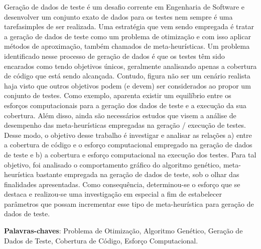 \begin{resumo}
 
Geração de dados de teste é um desafio corrente em Engenharia de Software e desenvolver um conjunto exato de dados para os testes nem sempre é uma tarefasimples de ser realizada.  Uma estratégia que vem sendo empregada é tratar a geração de dados de teste como um problema de otimização e com isso aplicar métodos de aproximação, também chamados de meta-heurísticas. Um problema identificado nesse processo de geração de dados é que os testes têm sido encarados como tendo objetivos únicos, geralmente analisando apenas a cobertura de código que está sendo alcançada. Contudo, figura não ser um cenário realista haja visto que outros objetivos podem (e devem) ser considerados ao propor um conjunto de testes. Como exemplo, aparenta existir um equilíbrio entre os esforços computacionais para a geração dos dados de teste e a execução da sua cobertura.  Além disso, ainda são necessários estudos que visem a análise de desempenho das meta-heurísticas empregadas na geração / execução de testes. Desse modo, o objetivo desse trabalho é investigar e analisar as relações a) entre a cobertura de código e o esforço computacional empregado na geração de dados de teste e b) a cobertura e esforço computacional na execução dos testes. Para tal objetivo, foi analisado o comportamento gráfico do algoritmo genético, meta-heurística bastante empregada na geração de dados de teste, sob o olhar das finalidades apresentadas. Como consequência, determinou-se o esforço que se destaca e realizou-se uma investigação em especial a fim de estabelecer parâmetros que possam incrementar esse tipo de meta-heurística para  geração de dados de teste. 
 \vspace{\onelineskip}
    
 \noindent
 \textbf{Palavras-chaves}: Problema de Otimização, Algoritmo Genético, Geração de Dados de Teste, Cobertura de Código, Esforço Computacional.
\end{resumo}
